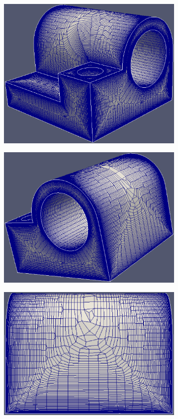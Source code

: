 \begin{figure}[hbt!]
	\centering
	\begin{subfigure}{.33\textwidth}
		\centering
		\includegraphics[width=.9\linewidth]{img/r/joint-x0.004-g1.04-a5/oblique.eps}
		\caption{}
		\label{fig-joint-oblique}
	\end{subfigure}%
	\begin{subfigure}{.33\textwidth}
		\centering
		\includegraphics[width=.9\linewidth]{img/r/joint-x0.004-g1.04-a5/oblique1.eps}
		\caption{}
		\label{fig-joint-oblique1}
	\end{subfigure}%
	\begin{subfigure}{.33\textwidth}
		\centering
		\includegraphics[width=.9\linewidth]{img/r/joint-x0.004-g1.04-a5/side.eps}

\end{subfigure}
\end{figure}
